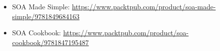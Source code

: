 

\begin{itemize}
\item 
SOA Made Simple: \url{https://www.packtpub.com/product/soa-made-simple/9781849684163}

\item 
SOA Cookbook: \url{https://www.packtpub.com/product/soa-cookbook/9781847195487}
\end{itemize}
